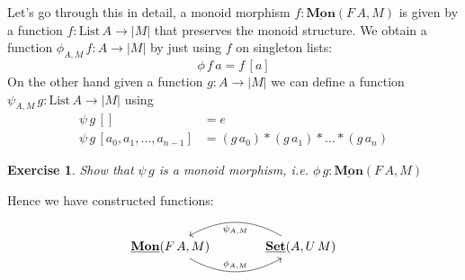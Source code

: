 \documentclass{article}
\newcommand{\Set}{\mathbf{Set}}
\newcommand{\cat}[1]{\underline{\mathbf{#1}}}
\newcommand{\obj}[1]{|#1|}
\newcommand{\List}{\mathrm{List}}
\newcommand{\app}{+\!\!+}
\newtheorem{exercise}{Exercise}
\begin{document}
Let's go through this in detail, a monoid morphism $f:\cat{Mon}(F\,A,M)$ is given by a function $f:\List\,A \to |M|$ that preserves the monoid structure. We obtain a function $\phi_{A,M}\,f : A \to |M|$ by just using $f$ on singleton lists: 
\[\phi\,f\,a = f\,[a]\] 
On the other hand given a function $g : A \to |M|$ we can define a function $\psi_{A,M}\,g : \List\,A \to |M|$ using
\begin{align*}
  \psi\,g\,[] & = e \\
  \psi\,g\, [a_0,a_1,\dots,a_{n-1}] & = (g\,a_0) * (g\,a_1) * \dots * (g\,a_n)
\end{align*}
\begin{exercise}
  Show that $\psi\,g$ is a monoid morphism, i.e. $\phi\,g : \cat{Mon}(F\,A,M)$
\end{exercise}
Hence we have constructed functions:
\[\begin{tikzcd}[column sep = large]
\cat{Mon}(F\,A,M) \arrow[r,"\phi_{A,M}",bend right] & \cat{\Set}(A,U\,M) \arrow[l,"\psi_{A,M}",bend right]
\end{tikzcd}\]

\end{document}
